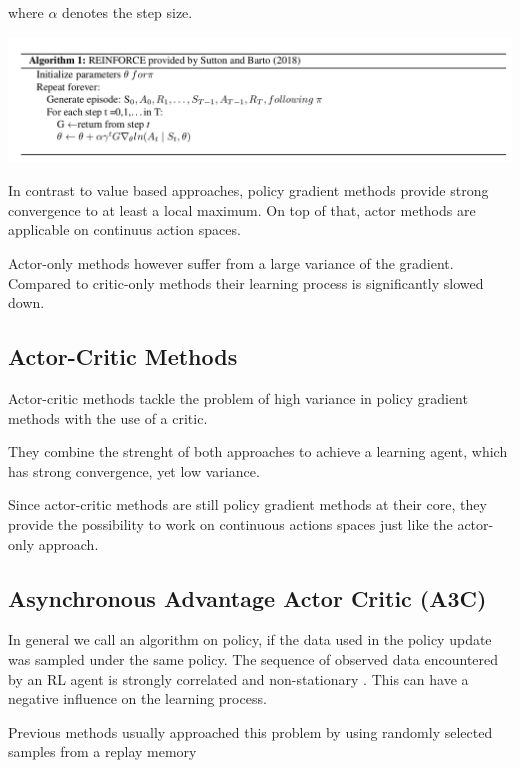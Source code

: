 where $\alpha$ denotes the step size.


\includegraphics[scale=0.4]{bilder/REINFORCE.png}
\pagebreak


In contrast to value based approaches, policy gradient methods provide strong convergence to at least a local maximum.
On top of that, actor methods are applicable on continuus action spaces.
 \citep{Sutton00policygradient}
 
Actor-only methods however suffer from a large variance of the gradient. Compared to critic-only methods their learning process is significantly slowed down. \citep{Grondman12}
 

\subsection{Actor-Critic Methods}

Actor-critic methods tackle the problem of high variance in policy gradient methods with the use of a critic. 

They combine the strenght of both approaches to achieve a learning agent, which has strong convergence, yet low variance.

Since actor-critic methods are still policy gradient methods at their core, they provide the possibility to work on continuous actions spaces just like the actor-only approach.

\pagebreak

\subsection{Asynchronous Advantage Actor Critic (A3C)}

In general we call an algorithm on policy, if the data used in the policy update was sampled under the same policy. The sequence of observed data encountered by an RL agent is strongly correlated and non-stationary \citep{A3C}. This can have a negative influence on the learning process.

Previous methods usually approached this problem by using randomly selected samples from a replay memory \citep{mnih2015atari}

